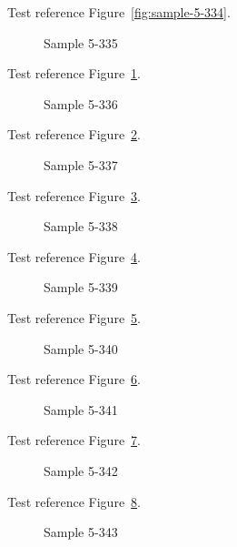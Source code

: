 Test reference Figure~\ref{fig:sample-5-334}.

\begin{figure}[tbhp]
\caption{Sample 5-335}
\label{fig:sample-5-335}
\end{figure}

Test reference Figure~\ref{fig:sample-5-335}.

\begin{figure}[tbhp]
\caption{Sample 5-336}
\label{fig:sample-5-336}
\end{figure}

Test reference Figure~\ref{fig:sample-5-336}.

\begin{figure}[tbhp]
\caption{Sample 5-337}
\label{fig:sample-5-337}
\end{figure}

Test reference Figure~\ref{fig:sample-5-337}.

\begin{figure}[tbhp]
\caption{Sample 5-338}
\label{fig:sample-5-338}
\end{figure}

Test reference Figure~\ref{fig:sample-5-338}.

\begin{figure}[tbhp]
\caption{Sample 5-339}
\label{fig:sample-5-339}
\end{figure}

Test reference Figure~\ref{fig:sample-5-339}.

\begin{figure}[tbhp]
\caption{Sample 5-340}
\label{fig:sample-5-340}
\end{figure}

Test reference Figure~\ref{fig:sample-5-340}.

\begin{figure}[tbhp]
\caption{Sample 5-341}
\label{fig:sample-5-341}
\end{figure}

Test reference Figure~\ref{fig:sample-5-341}.

\begin{figure}[tbhp]
\caption{Sample 5-342}
\label{fig:sample-5-342}
\end{figure}

Test reference Figure~\ref{fig:sample-5-342}.

\begin{figure}[tbhp]
\caption{Sample 5-343}
\label{fig:sample-5-343}
\end{figure}


